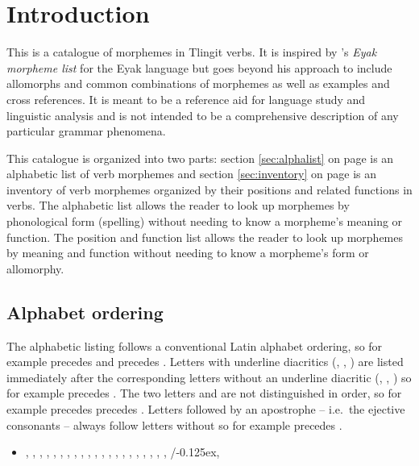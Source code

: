 
\section{Introduction}\label{sec:intro}

This is a catalogue of morphemes in Tlingit verbs.
It is inspired by \citeauthor{krauss:1981a}’s \textit{Eyak morpheme list} \parencite{krauss:1981a} for the Eyak language but goes beyond his approach to include allomorphs and common combinations of morphemes as well as examples and cross references.
It is meant to be a reference aid for language study and linguistic analysis and is not intended to be a comprehensive description of any particular grammar phenomena.

This catalogue is organized into two parts:
section \ref{sec:alphalist} on page \pageref{sec:alphalist} is an alphabetic list of verb morphemes
and section \ref{sec:inventory} on page \pageref{sec:inventory} is an inventory of verb morphemes organized by their positions and related functions in verbs.
The alphabetic list allows the reader to look up morphemes by phonological form (spelling) without needing to know a morpheme’s meaning or function.
The position and function list allows the reader to look up morphemes by meaning and function without needing to know a morpheme’s form or allomorphy.

\subsection{Alphabet ordering}\label{sec:intro-alpha}

The alphabetic listing follows a conventional Latin alphabet ordering, so for example  precedes  and  precedes .
Letters with underline diacritics (, , ) are listed immediately after the corresponding letters without an underline diacritic (, , ) so for example  precedes .
The two letters  and  are not distinguished in order, so for example  precedes  precedes .
Letters followed by an apostrophe – i.e.\ the ejective consonants – always follow letters without so for example  precedes .

\begin{itemize}
\item	{},
	,
	,
	,
	,
	,
	,
	,
	,
	,
	,
	,
	,
	,
	,
	,
	,
	,
	,
	,
	,
	/\kern-0.125ex,
\end{itemize}

